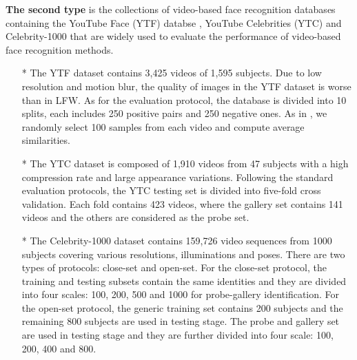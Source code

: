 \documentclass[journal,transmag]{IEEEtran}
\begin{document}
\textbf{The second type} is the collections of video-based face recognition databases containing the YouTube Face (YTF) databse \cite{DBLP:conf/cvpr/WolfHM11}, YouTube Celebrities (YTC) \cite{DBLP:conf/cvpr/KimKPR08} and Celebrity-1000 \cite{DBLP:journals/tcsv/LiuZLY14} that are widely used to evaluate the performance of video-based face recognition methods.
\begin{itemize}\setlength{\itemsep}{1pt}
\item[*] The YTF dataset contains 3,425 videos of 1,595 subjects. Due to low resolution and motion blur, the quality of images in the YTF dataset is worse than in LFW. As for the evaluation protocol, the database is divided into 10 splits, each includes 250 positive pairs and 250 negative ones. As in \cite{parkhi2015deep,schroff2015facenet}, we randomly select 100 samples from each video and compute average similarities.
\item[*] The YTC dataset is composed of 1,910 videos from 47 subjects with a high compression rate and large appearance variations. Following the standard evaluation protocols, the YTC testing set is divided into five-fold cross validation. Each fold contains 423 videos, where the gallery set contains 141 videos and the others are considered as the probe set.
\item[*] The Celebrity-1000 dataset contains 159,726 video sequences from 1000 subjects covering various resolutions, illuminations and poses. There are two types of protocols: close-set and open-set. For the close-set protocol, the training and testing subsets contain the same identities and they are divided into four scales: 100, 200, 500 and 1000 for probe-gallery identification. For the open-set protocol, the generic training set contains 200 subjects and the remaining 800 subjects are used in testing stage. The probe and gallery set are used in testing stage and they are further divided into four scale: 100, 200, 400 and 800.
\end{itemize}
\end{document}
